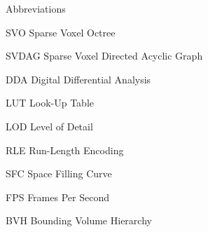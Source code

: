 \begin{dictionary}{Abbreviations}
    \item[SVO] Sparse Voxel Octree
    \item[SVDAG] Sparse Voxel Directed Acyclic Graph
    \item[DDA] Digital Differential Analysis
    \item[LUT] Look-Up Table
    \item[LOD] Level of Detail
    \item[RLE] Run-Length Encoding
    \item[SFC] Space Filling Curve
    \item[FPS] Frames Per Second
    \item[BVH] Bounding Volume Hierarchy
\end{dictionary}
